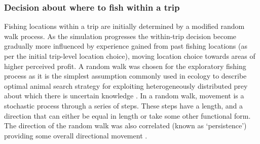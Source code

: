 \documentclass[review]{elsarticle}
\begin{document}
\subsubsection{Decision about where to fish within a trip}

Fishing locations within a trip are initially determined by a modified random
walk process. As the simulation progresses the within-trip decision become
gradually more influenced by experience gained from past fishing locations (as
per the initial trip-level location choice), moving location choice towards
areas of higher perceived profit. A random walk was chosen for the exploratory
fishing process as it is the simplest assumption commonly used in ecology to
describe optimal animal search strategy for exploiting heterogeneously
distributed prey about which there is uncertain knowledge
\citep{Viswanathan1999}. In a random walk, movement is a stochastic process
through a series of steps. These steps have a length, and a direction that can
either be equal in length or take some other functional form. The direction of
the random walk was also correlated (known as `persistence') providing some
overall directional movement \citep{Codling2008}. \\
\end{document}
